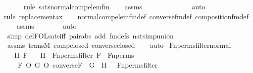 \begin{isabellebody}
\ \ \ \ \ \isamarkupfalse%
{\isacharparenleft}{\kern0pt}rule\ sats{\isacharunderscore}{\kern0pt}normal{\isacharunderscore}{\kern0pt}comp{\isacharunderscore}{\kern0pt}elem{\isacharunderscore}{\kern0pt}fm{\isacharparenright}{\kern0pt}\isanewline
\ \ \isamarkupfalse%
\ assms\isanewline
\ \ \ \ \ \ \ \ \ \ \ \ \isamarkupfalse%
\ auto{\isacharbrackleft}{\kern0pt}{}{\isacharbrackright}{\kern0pt}\isanewline
\ \ \ \ \isamarkupfalse%
{\isacharparenleft}{\kern0pt}rule\ replacement{\isacharunderscore}{\kern0pt}ax{\isacharparenright}{\kern0pt}\isanewline
\ \ \isamarkupfalse%
\ normal{\isacharunderscore}{\kern0pt}comp{\isacharunderscore}{\kern0pt}elem{\isacharunderscore}{\kern0pt}fm{\isacharunderscore}{\kern0pt}def\ converse{\isacharunderscore}{\kern0pt}fm{\isacharunderscore}{\kern0pt}def\ composition{\isacharunderscore}{\kern0pt}fm{\isacharunderscore}{\kern0pt}def\isanewline
\ \ \isamarkupfalse%
\ assms\isanewline
\ \ \ \ \ \ \isamarkupfalse%
\ auto{\isacharbrackleft}{\kern0pt}{}{\isacharbrackright}{\kern0pt}\isanewline
\ \ \isamarkupfalse%
\ {\isacharparenleft}{\kern0pt}simp\ del{\isacharcolon}{\kern0pt}FOL{\isacharunderscore}{\kern0pt}sats{\isacharunderscore}{\kern0pt}iff\ pair{\isacharunderscore}{\kern0pt}abs\ add{\isacharcolon}{\kern0pt}\ fm{\isacharunderscore}{\kern0pt}defs\ nat{\isacharunderscore}{\kern0pt}simp{\isacharunderscore}{\kern0pt}union{\isacharparenright}{\kern0pt}\isanewline
\ \ \isamarkupfalse%
\ assms\ transM\ comp{\isacharunderscore}{\kern0pt}closed\ converse{\isacharunderscore}{\kern0pt}closed\isanewline
\ \ \isamarkupfalse%
\ auto%
\endisatagproof
{\isafoldproof}%
%
\isadelimproof
\isanewline
%
\endisadelimproof
\isanewline
{}\isamarkupfalse%
\ Fn{\isacharunderscore}{\kern0pt}perms{\isacharunderscore}{\kern0pt}filter{\isacharunderscore}{\kern0pt}normal\ {\isacharcolon}{\kern0pt}\ \isanewline
\ \ \ H\ F\isanewline
\ \ \ {\isachardoublequoteopen}H\ {\isasymin}\ Fn{\isacharunderscore}{\kern0pt}perms{\isacharunderscore}{\kern0pt}filter{\isachardoublequoteclose}\ {\isachardoublequoteopen}F\ {\isasymin}\ Fn{\isacharunderscore}{\kern0pt}perms{\isachardoublequoteclose}\ \isanewline
\ \ \ {\isachardoublequoteopen}{\isacharbraceleft}{\kern0pt}\ F\ O\ G\ O\ converse{\isacharparenleft}{\kern0pt}F{\isacharparenright}{\kern0pt}\ {\isachardot}{\kern0pt}\ G\ {\isasymin}\ H\ {\isacharbraceright}{\kern0pt}\ {\isasymin}\ Fn{\isacharunderscore}{\kern0pt}perms{\isacharunderscore}{\kern0pt}filter{\isachardoublequoteclose}\ \isanewline

\end{isabellebody}
